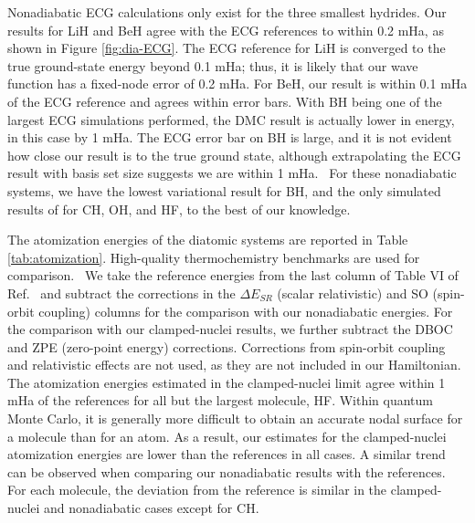 Nonadiabatic ECG calculations only exist for the three smallest hydrides. Our results for LiH and BeH agree with the ECG references to within 0.2 mHa, as shown in Figure \ref{fig:dia-ECG}. The ECG reference for LiH is converged to the true ground-state energy beyond 0.1 mHa; thus, it is likely that our wave function has a fixed-node error of 0.2 mHa. For BeH, our result is within 0.1 mHa of the ECG reference and agrees within error bars. With BH being one of the largest ECG simulations performed, the DMC result is actually lower in energy, in this case by 1 mHa. The ECG error bar on BH is large, and it is not evident how close our result is to the true ground state, although extrapolating the ECG result with basis set size suggests we are within 1 mHa.~\cite{Bubin_BeH_noBO} For these nonadiabatic systems, we have the lowest variational result for BH, and the only simulated results of for CH, OH, and HF, to the best of our knowledge.

The atomization energies of the diatomic systems are reported in Table \ref{tab:atomization}. High-quality thermochemistry benchmarks are used for comparison.~\cite{Feller_Corrections} We take the reference energies from the last column of Table VI of Ref.~\cite{Feller_Corrections} and subtract the corrections in the $\Delta E_{SR}$ (scalar relativistic) and SO (spin-orbit coupling) columns for the comparison with our nonadiabatic energies. For the comparison with our clamped-nuclei results, we further subtract the DBOC and ZPE (zero-point energy) corrections. Corrections from spin-orbit coupling and relativistic effects are not used, as they are not included in our Hamiltonian. The atomization energies estimated in the clamped-nuclei limit agree within 1 mHa of the references for all but the largest molecule, HF. Within quantum Monte Carlo, it is generally more difficult to obtain an accurate nodal surface for a molecule than for an atom. As a result, our estimates for the clamped-nuclei atomization energies are lower than the references in all cases. A similar trend can be observed when comparing our nonadiabatic results with the references. For each molecule, the deviation from the reference is similar in the clamped-nuclei and nonadiabatic cases except for CH.

